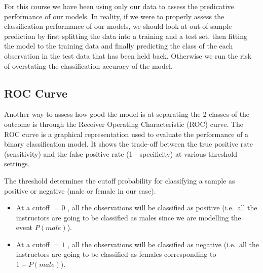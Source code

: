 \documentclass[
  letterpaper,
  DIV=11,
  numbers=noendperiod]{scrartcl}
\begin{document}
\begin{tcolorbox}[enhanced jigsaw, colframe=quarto-callout-note-color-frame, toprule=.15mm, toptitle=1mm, opacitybacktitle=0.6, breakable, colback=white, opacityback=0, title=\textcolor{quarto-callout-note-color}{\faInfo}\hspace{0.5em}{Note}, rightrule=.15mm, bottomrule=.15mm, coltitle=black, colbacktitle=quarto-callout-note-color!10!white, leftrule=.75mm, left=2mm, arc=.35mm, bottomtitle=1mm, titlerule=0mm]

For this course we have been using only our data to assess the
predicative performance of our models. In reality, if we were to
properly assess the classification performance of our models, we should
look at out-of-sample prediction by first splitting the data into a
training and a test set, then fitting the model to the training data and
finally predicting the class of the each observation in the test data
that has been held back. Otherwise we run the risk of overstating the
classification accuracy of the model.

\end{tcolorbox}

\subsection{ROC Curve}\label{roc-curve}

Another way to assess how good the model is at separating the 2 classes
of the outcome is through the Receiver Operating Characteristic (ROC)
curve. The ROC curve is a graphical representation used to evaluate the
performance of a binary classification model. It shows the trade-off
between the true positive rate (sensitivity) and the false positive rate
(1 - specificity) at various threshold settings.

The threshold determines the cutoff probability for classifying a sample
as positive or negative (male or female in our case).

\begin{itemize}
\item
  At a cutoff \(=0\) , all the observations will be classified as
  positive (i.e.~all the instructors are going to be classified as males
  since we are modelling the event \(P(male)\)).
\item
  At a cutoff \(=1\) , all the observations will be classified as
  negative (i.e.~all the instructors are going to be classified as
  females corresponding to \(1 - P(male)\)).
\end{itemize}
\end{document}
